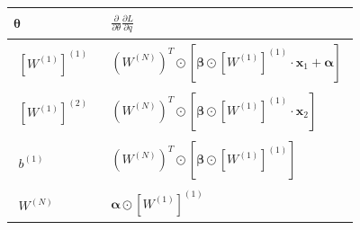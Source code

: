 \documentclass[a4paper, 12pt]{scrartcl}
\begin{document}
\begin{center}
    \begin{tabular}{l| l }
        $\bm{\theta}$ 
        & 
        $\begin{aligned} \frac{\partial}{\partial \theta} \frac{\partial L}{\partial q} \end{aligned}$ 
        \\[0.5em] \hline
        \noalign{\vspace{0.5em}}
        $\begin{aligned} \left[W^{(1)}\right]^{(1)} \end{aligned}$ 
        & 
        $\begin{aligned}
            \left(W^{(N)}\right)^T 
            \odot
            \left[
                \bm{\beta} \odot \left[W^{(1)}\right]^{(1)} \cdot \bm{x}_1 + \bm{\alpha}
            \right]
        \end{aligned}$ 
        \\[0.5em] \hline
        \noalign{\vspace{0.5em}}
        $\begin{aligned} \left[W^{(1)}\right]^{(2)} \end{aligned}$ 
        & 
        $\begin{aligned} 
            \left(W^{(N)}\right)^T 
            \odot
            \left[
                \bm{\beta} \odot \left[W^{(1)}\right]^{(1)} \cdot \bm{x}_2
            \right]
        \end{aligned}$ 
        \\[0.5em] \hline
        \noalign{\vspace{0.5em}}
        $\begin{aligned} b^{(1)} \end{aligned}$ 
        & 
        $\begin{aligned} 
            \left(W^{(N)}\right)^T 
            \odot
            \left[
                \bm{\beta} \odot \left[W^{(1)}\right]^{(1)} 
            \right]
        \end{aligned}$ 
        \\[0.5em] \hline
        \noalign{\vspace{0.5em}}
        $\begin{aligned} W^{(N)} \end{aligned}$ 
        & 
        $\begin{aligned}
            \bm{\alpha} \odot \left[W^{(1)}\right]^{(1)}
        \end{aligned}$ 
    \end{tabular}
\end{center}
\end{document}
